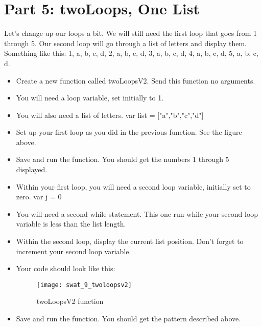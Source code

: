 \documentclass{article}
\begin{document}
\section*{Part 5: twoLoops, One List}
Let's change up our loops a bit.  We will still need the first loop that goes from 1 through 5. Our second loop will go through a list of letters and display them.  Something like this:  1, a, b, c, d, 2, a, b, c, d, 3, a, b, c, d, 4, a, b, c, d, 5, a, b, c, d.
\begin{itemize}
    \item Create a new function called twoLoopsV2.  Send this function no arguments.
    \item You will need a loop variable, set initially to 1.
    \item You will also need a list of letters.  var list = ["a","b","c","d"]
    \item Set up your first loop as you did in the previous function.  See the figure above.
    \item Save and run the function.  You should get the numbers 1 through 5 displayed.
    \item Within your first loop, you will need a second loop variable, initially set to zero.  var j = 0
    \item You will need a second while statement.  This one run while your second loop variable is less than the list length.
    \item Within the second loop, display the current list position.  Don't forget to increment your second loop variable.
    \item Your code should look like this:
    \begin{figure}[H]
  		\centering
  		\texttt{[image: swat\_9\_twoloopsv2]}
  		\caption{twoLoopsV2 function}
	\end{figure}
	\item Save and run the function.  You should get the pattern described above.
\end{itemize}
\end{document}
